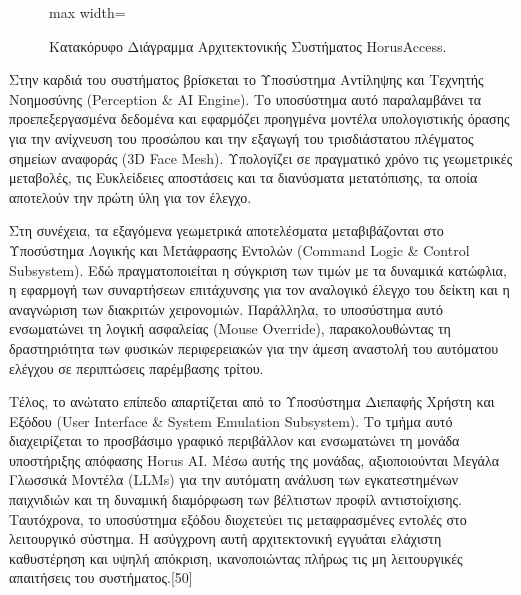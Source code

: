 \documentclass[twoside, a4paper, 11pt]{article}
\begin{document}
\begin{figure}[H]
\begin{adjustbox}{max width=\textwidth}
    \end{adjustbox}
    \caption{Κατακόρυφο Διάγραμμα Αρχιτεκτονικής Συστήματος HorusAccess.}
\end{figure}

Στην καρδιά του συστήματος βρίσκεται το Υποσύστημα Αντίληψης και Τεχνητής Νοημοσύνης (Perception \& AI Engine). Το υποσύστημα αυτό παραλαμβάνει τα προεπεξεργασμένα δεδομένα και εφαρμόζει προηγμένα μοντέλα υπολογιστικής όρασης για την ανίχνευση του προσώπου και την εξαγωγή του τρισδιάστατου πλέγματος σημείων αναφοράς (3D Face Mesh). Υπολογίζει σε πραγματικό χρόνο τις γεωμετρικές μεταβολές, τις Ευκλείδειες αποστάσεις και τα διανύσματα μετατόπισης, τα οποία αποτελούν την πρώτη ύλη για τον έλεγχο.

Στη συνέχεια, τα εξαγόμενα γεωμετρικά αποτελέσματα μεταβιβάζονται στο Υποσύστημα Λογικής και Μετάφρασης Εντολών (Command Logic \& Control Subsystem). Εδώ πραγματοποιείται η σύγκριση των τιμών με τα δυναμικά κατώφλια, η εφαρμογή των συναρτήσεων επιτάχυνσης για τον αναλογικό έλεγχο του δείκτη και η αναγνώριση των διακριτών χειρονομιών. Παράλληλα, το υποσύστημα αυτό ενσωματώνει τη λογική ασφαλείας (Mouse Override), παρακολουθώντας τη δραστηριότητα των φυσικών περιφερειακών για την άμεση αναστολή του αυτόματου ελέγχου σε περιπτώσεις παρέμβασης τρίτου.

Τέλος, το ανώτατο επίπεδο απαρτίζεται από το Υποσύστημα Διεπαφής Χρήστη και Εξόδου (User Interface \& System Emulation Subsystem). Το τμήμα αυτό διαχειρίζεται το προσβάσιμο γραφικό περιβάλλον και ενσωματώνει τη μονάδα υποστήριξης απόφασης Horus AI. Μέσω αυτής της μονάδας, αξιοποιούνται Μεγάλα Γλωσσικά Μοντέλα (LLMs) για την αυτόματη ανάλυση των εγκατεστημένων παιχνιδιών και τη δυναμική διαμόρφωση των βέλτιστων προφίλ αντιστοίχισης. Ταυτόχρονα, το υποσύστημα εξόδου διοχετεύει τις μεταφρασμένες εντολές στο λειτουργικό σύστημα. Η ασύγχρονη αυτή αρχιτεκτονική εγγυάται ελάχιστη καθυστέρηση και υψηλή απόκριση, ικανοποιώντας πλήρως τις μη λειτουργικές απαιτήσεις του συστήματος.[50]
\end{document}

